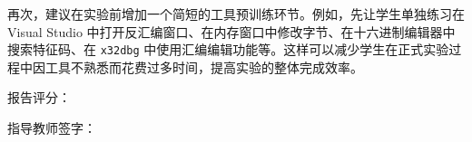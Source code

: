 ﻿\documentclass[12pt]{ctexart}
\begin{document}
再次，建议在实验前增加一个简短的工具预训练环节。例如，先让学生单独练习在 Visual Studio 中打开反汇编窗口、在内存窗口中修改字节、在十六进制编辑器中搜索特征码、在 \texttt{x32dbg} 中使用汇编编辑功能等。这样可以减少学生在正式实验过程中因工具不熟悉而花费过多时间，提高实验的整体完成效率。

\vspace{1.2cm}

\begin{flushright}
    {\heiti{} 报告评分：}\qquad\qquad\qquad\qquad

    \vspace{1.2cm}

    {\heiti{} 指导教师签字：}\qquad\qquad\qquad
\end{flushright}
\end{document}
